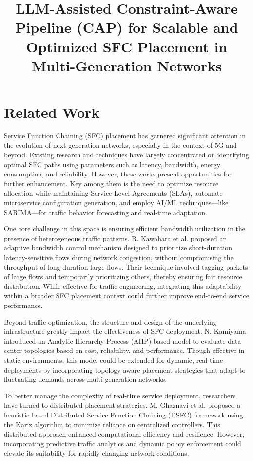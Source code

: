 \documentclass[conference]{IEEEtran}
\title{LLM-Assisted Constraint-Aware Pipeline (CAP) for Scalable and Optimized SFC Placement in Multi-Generation Networks}
\author{ \IEEEauthorblockN{Author 1, Author 2, Author 3, Author 4} \IEEEauthorblockA{Department of Computer Science, University Name, Country\ Email: author1@example.com, author2@example.com, author3@example.com, author4@example.com} }
\begin{document}
\maketitle

\section{Related Work}

Service Function Chaining (SFC) placement has garnered significant attention in the evolution of next-generation networks, especially in the context of 5G and beyond. Existing research and techniques have largely concentrated on identifying optimal SFC paths using parameters such as latency, bandwidth, energy consumption, and reliability. However, these works present opportunities for further enhancement. Key among them is the need to optimize resource allocation while maintaining Service Level Agreements (SLAs), automate microservice configuration generation, and employ AI/ML techniques—like SARIMA—for traffic behavior forecasting and real-time adaptation.

One core challenge in this space is ensuring efficient bandwidth utilization in the presence of heterogeneous traffic patterns. R. Kawahara et al. proposed an adaptive bandwidth control mechanism designed to prioritize short-duration latency-sensitive flows during network congestion, without compromising the throughput of long-duration large flows. Their technique involved tagging packets of large flows and temporarily prioritizing others, thereby ensuring fair resource distribution. While effective for traffic engineering, integrating this adaptability within a broader SFC placement context could further improve end-to-end service performance.

Beyond traffic optimization, the structure and design of the underlying infrastructure greatly impact the effectiveness of SFC deployment. N. Kamiyama introduced an Analytic Hierarchy Process (AHP)-based model to evaluate data center topologies based on cost, reliability, and performance. Though effective in static environments, this model could be extended for dynamic, real-time deployments by incorporating topology-aware placement strategies that adapt to fluctuating demands across multi-generation networks.

To better manage the complexity of real-time service deployment, researchers have turned to distributed placement strategies. M. Ghaznavi et al. proposed a heuristic-based Distributed Service Function Chaining (DSFC) framework using the Kariz algorithm to minimize reliance on centralized controllers. This distributed approach enhanced computational efficiency and resilience. However, incorporating predictive traffic analytics and dynamic policy enforcement could elevate its suitability for rapidly changing network conditions.
\end{document}

